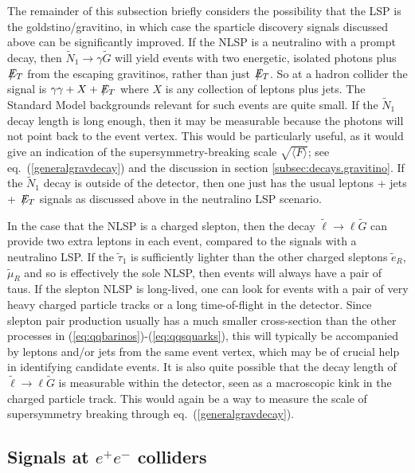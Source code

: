 \documentclass[12pt]{article}
\def\stilde{\widetilde}
\def\G{\stilde G}
\def\NI{\stilde N_1}
\def\Et{{\slashchar{E}_T}}
\def\slashchar#1{\setbox0=\hbox{$#1$}           %
   \dimen0=\wd0                                 %
   \setbox1=\hbox{/} \dimen1=\wd1               %
   \ifdim\dimen0>\dimen1                        %
      \rlap{\hbox to \dimen0{\hfil/\hfil}}      %
      #1                                        %
   \else                                        %
      \rlap{\hbox to \dimen1{\hfil$#1$\hfil}}   %
      /                                         %
   \fi}                                        %
\begin{document}
The remainder of this subsection briefly considers the possibility that 
the LSP is the goldstino/gravitino, in which case the sparticle discovery 
signals discussed above can be significantly improved. If the NLSP is a 
neutralino with a prompt decay, then $\NI\rightarrow \gamma\G$ will yield 
events with two energetic, isolated photons plus $\Et$ from the escaping 
gravitinos, rather than just $\Et$. So at a hadron collider the signal is 
$\gamma\gamma+X+\Et$ where $X$ is any collection of leptons plus jets. The 
Standard Model backgrounds relevant for such events are quite small. If 
the $\NI$ decay length is long enough, then it may be measurable because 
the photons will not point back to the event vertex. This would be 
particularly useful, as it would give an indication of the 
supersymmetry-breaking scale $\sqrt{\langle F \rangle}$; see 
eq.~(\ref{generalgravdecay}) and the discussion in section 
\ref{subsec:decays.gravitino}. If the $\NI$ decay is outside of the 
detector, then one just has the usual leptons + jets + $\Et$ signals as 
discussed above in the neutralino LSP scenario.

In the case that the NLSP is a charged slepton, then the decay $\stilde 
\ell \rightarrow \ell\G$ can provide two extra leptons in each event, 
compared to the signals with a neutralino LSP. If the $\stilde \tau_1$ is 
sufficiently lighter than the other charged sleptons $\stilde e_R$, 
$\stilde \mu_R$ and so is effectively the sole NLSP, then events will 
always have a pair of taus. If the slepton NLSP is long-lived, one can 
look for events with a pair of very heavy charged particle tracks or a 
long time-of-flight in the detector. Since slepton pair production usually 
has a much smaller cross-section than the other processes in 
(\ref{eq:qqbarinos})-(\ref{eq:qqsquarks}), this will typically be 
accompanied by leptons and/or jets from the same event vertex, which may 
be of crucial help in identifying candidate events. It is also quite 
possible that the decay length of $\stilde \ell \rightarrow \ell\G$ is 
measurable within the detector, seen as a macroscopic kink in the charged 
particle track. This would again be a way to measure the scale
of supersymmetry breaking through eq.~(\ref{generalgravdecay}).

\subsection{Signals at $e^+e^-$ colliders}\label{subsec:signals.LEPNLC}
\setcounter{equation}{0}
\setcounter{footnote}{1}
\end{document}
